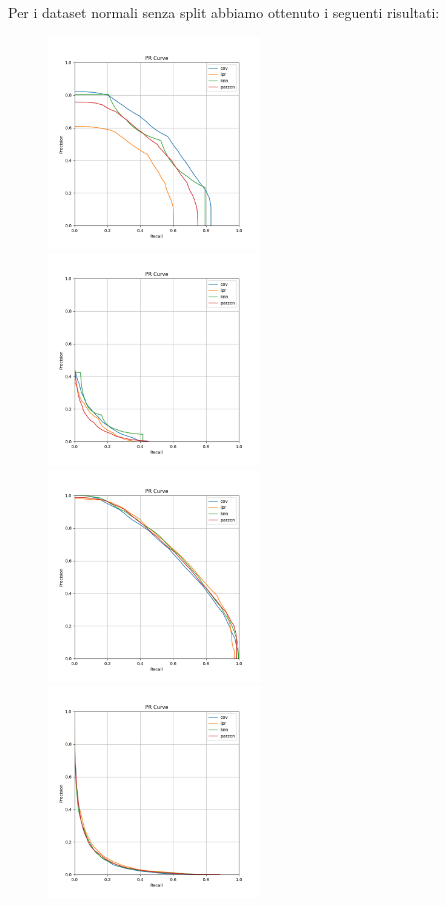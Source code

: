 Per i dataset normali senza split abbiamo ottenuto i seguenti risultati:

\begin{figure}[!ht]
    \includegraphics[width=0.5\textwidth]{../images/toyexperiments/prcurves/PRCurve_nosplit_k4_s1.png}
    \includegraphics[width=0.5\textwidth]{../images/toyexperiments/prcurves/PRCurve_nosplit_k4_s3.png}
    \includegraphics[width=0.5\textwidth]{../images/toyexperiments/prcurves/PRCurve_nosplit_ksqrt_s1.png}
    \includegraphics[width=0.5\textwidth]{../images/toyexperiments/prcurves/PRCurve_nosplit_ksqrt_s3.png}
\end{figure}

